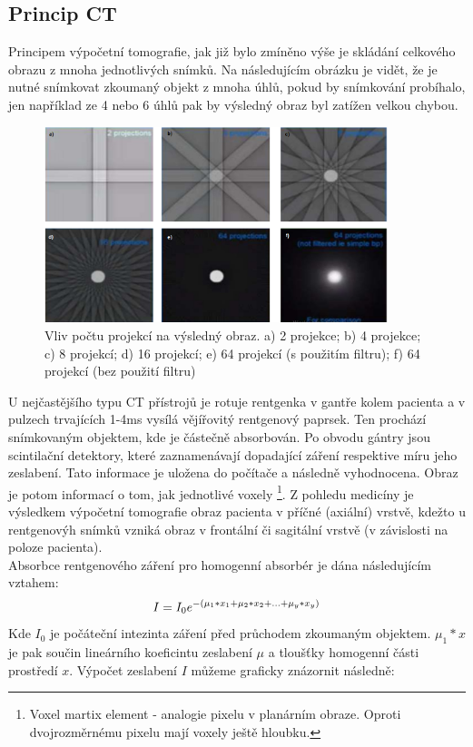 \documentclass{thesis}%
\begin{document}
\subsection{Princip CT}
Principem výpočetní tomografie, jak již bylo zmíněno výše je skládání celkového obrazu z mnoha jednotlivých snímků. Na následujícím obrázku je vidět, že je nutné snímkovat zkoumaný objekt z mnoha úhlů, pokud by snímkování probíhalo, jen například ze 4 nebo 6 úhlů pak by výsledný obraz byl zatížen velkou chybou.
\begin{figure}[h]
 \centering
	\includegraphics[width=10cm]{multiple_peojectionF.png}
	\caption[Vliv počtu projekcí na výsledný obraz]{Vliv počtu projekcí na výsledný obraz. a) 2 projekce; b) 4 projekce; c) 8 projekcí; d) 16 projekcí; e) 64 projekcí (s použitím filtru); f) 64 projekcí (bez použití filtru)}
\end{figure}
 U nejčastějšího typu CT přístrojů je rotuje rentgenka v gantře kolem pacienta a v pulzech trvajících 1-4ms vysílá vějířovitý rentgenový paprsek. Ten prochází snímkovaným objektem, kde je částečně absorbován. Po obvodu gántry jsou scintilační detektory, které zaznamenávají dopadající záření respektive míru jeho zeslabení. Tato informace je uložena do počítače a následně vyhodnocena. Obraz je potom informací o tom, jak jednotlivé voxely \footnote[5]{Voxel martix element - analogie pixelu v planárním obraze. Oproti dvojrozměrnému pixelu mají voxely ještě hloubku.}. Z pohledu medicíny je výsledkem výpočetní tomografie obraz pacienta v příčné (axiální) vrstvě, kdežto u rentgenovýh snímků vzniká obraz v frontální či sagitální vrstvě (v závislosti na poloze pacienta).\\
Absorbce rentgenového záření pro homogenní absorbér je dána následujícím vztahem:
\begin{equation}
 \centering
	I = I_{0}e^{-( \mu_{1}*x_{1} + \mu_{2}*x_{2} + ... + \mu_{y}*x_{y})}	
\end{equation}
Kde $ I_{0}$ je počáteční intezinta záření před průchodem zkoumaným objektem. $ \mu_{1}*x$ je pak součin lineárního koeficintu zeslabení $\mu$ a tloušťky homogenní části prostředí $x$. Výpočet zeslabení $I$ můžeme graficky znázornit následně:
\end{document}
